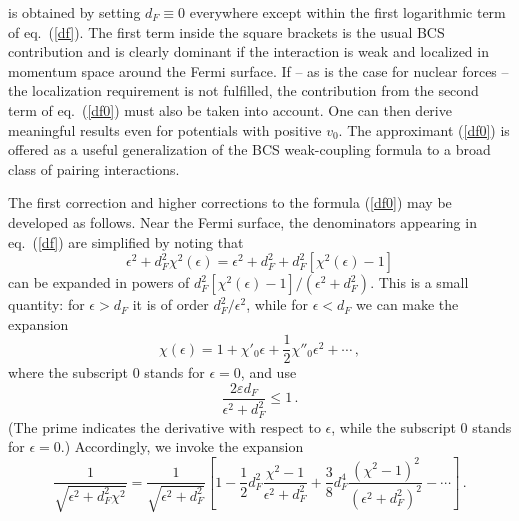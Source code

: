 is obtained by setting $d_F\equiv 0$ everywhere except within
the first logarithmic term of eq.~(\ref{df}).  The first term inside
the square brackets is the usual BCS contribution
and is clearly dominant if the interaction is weak and localized
in momentum space around the Fermi surface.  If -- as is the
case for nuclear forces -- the localization
requirement is not fulfilled, the contribution from the second term of
eq.~(\ref{df0}) must also be taken into account.   One can then
derive meaningful results even for potentials with positive $v_0$.
The approximant (\ref{df0}) is offered as a useful generalization of the
BCS weak-coupling formula to a broad class of pairing interactions.

The first correction and higher corrections to the formula (\ref{df0})
may be developed as follows.  Near the Fermi surface, the denominators
appearing in eq.~(\ref{df}) are simplified by noting that
\begin{equation}
\epsilon^2 + d_F^2\chi^2(\epsilon) = \epsilon^2 + d_F^2 +
	d_F^2 \left[\chi^2(\epsilon) - 1\right]
\end{equation}
can be expanded in powers of
$d_F^2 \left[\chi^2(\epsilon) - 1\right]/(\epsilon^2 + d_F^2) $.
This is a small quantity: for $\epsilon > d_F$ it is of order
$d^2_F/\epsilon^2$, while for $\epsilon < d_F$ we can make
the expansion
\begin{equation}
\chi(\epsilon) = 1 + \chi'_0\epsilon +
	\frac12\chi''_0\epsilon^2 + \cdots \, ,
\end{equation}
where the subscript 0 stands for $\epsilon=0$, and use
\begin{equation}
\frac{2\varepsilon d_F}{\epsilon^2 + d_F^2} \leq 1 \, .
\end{equation}
(The prime indicates the derivative with respect to $\epsilon$,
while the subscript 0 stands for $\epsilon=0$.)
Accordingly, we invoke the expansion
\begin{equation}
\frac{1}{\sqrt{\epsilon^2 + d^2_F \chi^2}} =
	\frac{1}{\sqrt{\epsilon^2 + d^2_F}}
	\left[ 1 - \frac12 d^2_F \frac{\chi^2 - 1}{\epsilon^2 + d^2_F}
        + \frac38 d^4_F \frac{{(\chi^2 - 1)}^2}{{(\epsilon^2 + d^2_F)}^2} -
         \cdots
	\right] \, . \label{chiexpansion}
\end{equation}

